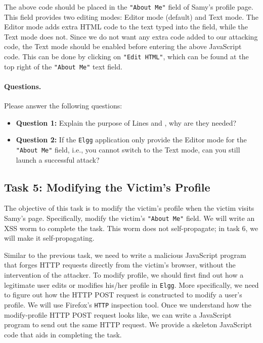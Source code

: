 The above code should be placed in the \texttt{"About Me"} field of Samy's profile page. 
This field provides two editing modes: Editor mode (default) and Text mode. 
The Editor mode adds extra HTML code to the text typed into the field, while
the Text mode does not. Since we do not
want any extra code added to our attacking code, the Text mode should be enabled before entering
the above JavaScript code. This can be done by clicking on 
\texttt{"Edit HTML"}, which can be found at the top right
of the \texttt{"About Me"} text field.


\paragraph{Questions.} Please answer the following questions:

\begin{itemize}
\item \textbf{Question 1:} Explain the purpose of Lines  and , why
are they needed?

\item \textbf{Question 2:} If the \texttt{Elgg} application only provide 
the Editor mode for the \texttt{"About Me"} field, i.e., you cannot 
switch to the Text mode, can you still launch a successful attack? 
\end{itemize}
 



\subsection{Task 5: Modifying the Victim's Profile}


The objective of this task is to modify the victim's profile when the victim visits Samy's
page. Specifically, modify the victim's \texttt{"About Me"} field. We will write an XSS worm
to complete the task. This worm does not self-propagate; in task 6, we will make it self-propagating.

Similar to the previous task, we need to write a malicious JavaScript program that forges HTTP
requests directly from the victim's browser, without the intervention of the attacker.  
To modify profile, we should first find out how a legitimate 
user edits or modifies his/her profile in {\tt Elgg}. More specifically, we need to figure out
how the HTTP POST request is constructed to modify a user's profile.  
We will use Firefox's {\tt HTTP} inspection tool. Once we understand 
how the modify-profile HTTP POST request looks like, we can
write a JavaScript program to send out the same HTTP request. We provide a skeleton JavaScript
code that aids in completing the task.

